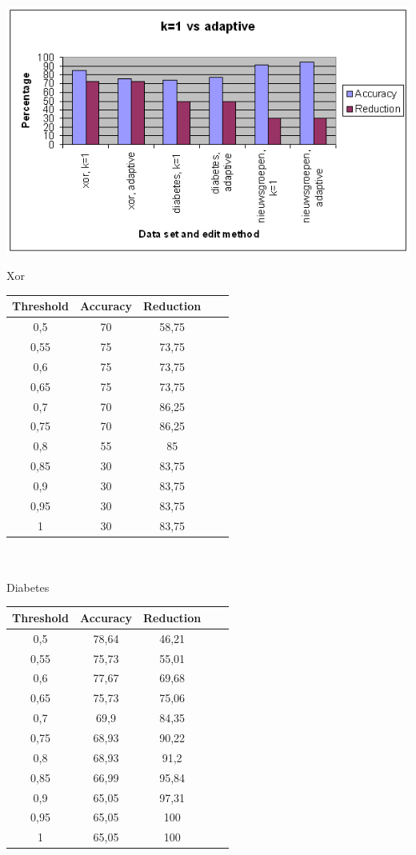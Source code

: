 \documentclass{article}
\begin{document}
\begin{center} \includegraphics[scale=0.7]{GG_k1_vs_adaptive} \end{center}
Xor\\
\begin{tabular}{|c|c|c|c|c|}  \hline			
Threshold	& Accuracy &	Reduction \\ \hline
0,5 &	70 &	58,75 \\
0,55 &	75 &	73,75 \\
0,6 &	75 &	73,75 \\
0,65 &	75 &	73,75 \\
0,7 &	70 &	86,25 \\
0,75 &	70 &	86,25 \\
0,8 &	55 &	85 \\
0,85 &	30 &	83,75 \\
0,9 &	30 & 83,75 \\
0,95 &	30 &	83,75 \\
1 &	30 &	83,75 \\ \hline
\end{tabular} \\
\\
Diabetes\\
\begin{tabular}{|c|c|c|c|c|}  \hline
Threshold	& Accuracy &	Reduction \\ \hline
0,5 &	78,64 &	46,21 \\
0,55 &	75,73 &	55,01 \\
0,6 &	77,67	 & 69,68 \\
0,65 &	75,73 &	75,06 \\
0,7 &	69,9 &	84,35 \\
0,75 &	68,93 &	90,22 \\
0,8 &	68,93 &	91,2 \\
0,85 &	66,99 &	95,84 \\
0,9 &	65,05 &	97,31 \\
0,95 &	65,05 &	100 \\
1 &	65,05 &	100 \\ \hline
\end{tabular} \\
\end{document}
